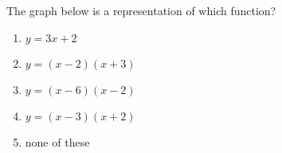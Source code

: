 \bigskip

\item The graph below is a representation of which function?


\begin{minipage}{0.4\columnwidth}
    \begin{enumerate}
        \item $y = 3x + 2$
        \item $y = (x-2)(x+3)$
        \item $y = (x-6)(x-2)$
        \item $y = (x-3)(x+2)$
        \item none of these
    \end{enumerate}
\end{minipage}
\begin{minipage}{0.6\columnwidth}
\end{minipage}

